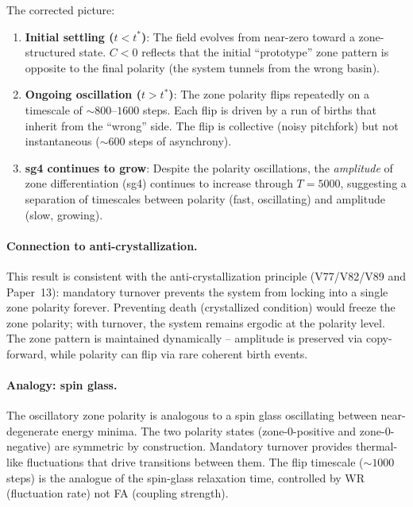 \documentclass[11pt,a4paper]{article}
\begin{document}
The corrected picture:
\begin{enumerate}
  \item \textbf{Initial settling ($t < t^*$)}: The field evolves from near-zero
        toward a zone-structured state.  $C < 0$ reflects that the initial
        ``prototype'' zone pattern is opposite to the final polarity (the system
        tunnels from the wrong basin).
  \item \textbf{Ongoing oscillation ($t > t^*$)}: The zone polarity flips
        repeatedly on a timescale of $\sim 800$--$1600$ steps.  Each flip is
        driven by a run of births that inherit from the ``wrong'' side.  The
        flip is collective (noisy pitchfork) but not instantaneous ($\sim 600$
        steps of asynchrony).
  \item \textbf{sg4 continues to grow}: Despite the polarity oscillations, the
        \emph{amplitude} of zone differentiation (sg4) continues to increase
        through $T=5000$, suggesting a separation of timescales between polarity
        (fast, oscillating) and amplitude (slow, growing).
\end{enumerate}

\paragraph{Connection to anti-crystallization.}
This result is consistent with the anti-crystallization principle
(V77/V82/V89 and Paper~13): mandatory turnover prevents the system from
locking into a single zone polarity forever.  Preventing death (crystallized
condition) would freeze the zone polarity; with turnover, the system remains
ergodic at the polarity level.  The zone pattern is maintained dynamically --
amplitude is preserved via copy-forward, while polarity can flip via rare
coherent birth events.

\paragraph{Analogy: spin glass.}
The oscillatory zone polarity is analogous to a spin glass oscillating between
near-degenerate energy minima.  The two polarity states (zone-0-positive and
zone-0-negative) are symmetric by construction.  Mandatory turnover provides
thermal-like fluctuations that drive transitions between them.  The flip
timescale ($\sim 1000$ steps) is the analogue of the spin-glass relaxation
time, controlled by WR (fluctuation rate) not FA (coupling strength).
\end{document}

